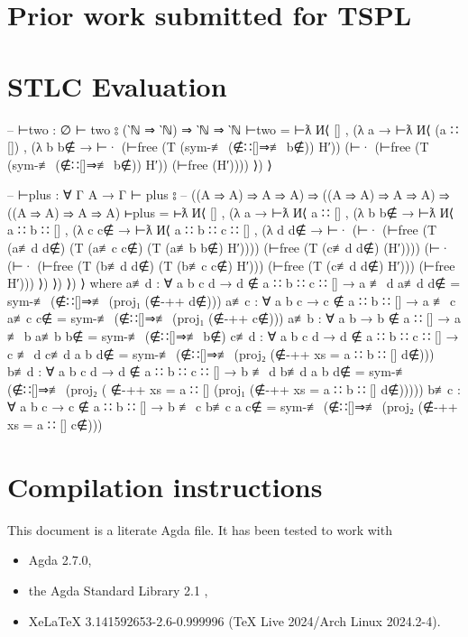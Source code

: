 \documentclass[logo,bsc,singlespacing,parskip,online]{infthesis}
\renewenvironment{code}{\mintedcopy[breaklines,breaksymbolleft=\;]{agda}}{\endmintedcopy}
\begin{document}
\chapter{Prior work submitted for TSPL}
\label{appendix:tspl}


\chapter{STLC Evaluation}
\label{appendix:evaluation_proofs}
\begin{code}
-- ⊢two : ∅ ⊢ two ⦂ (‵ℕ ⇒ ‵ℕ) ⇒ ‵ℕ ⇒ ‵ℕ
⊢two = ⊢ƛ
  И⟨ []
  , (λ a → ⊢ƛ
    И⟨ (a ∷ [])
    , (λ b {b∉} →
      ⊢·
      (⊢free (T (sym-≢ (∉∷[]⇒≢ b∉)) H′))
      (⊢· (⊢free (T (sym-≢ (∉∷[]⇒≢ b∉)) H′)) (⊢free (H′)))) ⟩) ⟩

-- ⊢plus : ∀ {Γ A} → Γ ⊢ plus ⦂
-- ((A ⇒ A) ⇒ A ⇒ A) ⇒ ((A ⇒ A) ⇒ A ⇒ A) ⇒ ((A ⇒ A) ⇒ A ⇒ A)
⊢plus = ⊢ƛ
  И⟨ []
  , (λ a → ⊢ƛ
    И⟨ a ∷ []
    , (λ b {b∉} → ⊢ƛ
      И⟨ a ∷ b ∷ []
      , (λ c {c∉} → ⊢ƛ
        И⟨ a ∷ b ∷ c ∷ []
        , (λ d {d∉} →
        ⊢·
          (⊢·
            (⊢free (T (a≢d d∉) (T (a≢c c∉) (T (a≢b b∉) H′))))
            (⊢free (T (c≢d d∉) (H′))))
          (⊢·
            (⊢·
              (⊢free (T (b≢d d∉) (T (b≢c c∉) H′)))
              (⊢free (T (c≢d d∉) H′)))
            (⊢free H′))) ⟩) ⟩) ⟩) ⟩
  where
    a≢d : ∀ {a b c d} → d ∉ a ∷ b ∷ c ∷ [] → a ≢ d
    a≢d d∉ = sym-≢ (∉∷[]⇒≢ (proj₁ (∉-++ d∉)))
    a≢c : ∀ {a b c} → c ∉ a ∷ b ∷ [] → a ≢ c
    a≢c c∉ = sym-≢ (∉∷[]⇒≢ (proj₁ (∉-++ c∉)))
    a≢b : ∀ {a b} → b ∉ a ∷ [] → a ≢ b
    a≢b b∉ = sym-≢ (∉∷[]⇒≢ b∉)
    c≢d : ∀ {a b c d} → d ∉ a ∷ b ∷ c ∷ [] → c ≢ d
    c≢d {a} {b} d∉ =
      sym-≢ (∉∷[]⇒≢ (proj₂ (∉-++ {xs = a ∷ b ∷ []} d∉)))
    b≢d : ∀ {a b c d} → d ∉ a ∷ b ∷ c ∷ [] → b ≢ d
    b≢d {a} {b} d∉ =
      sym-≢ (∉∷[]⇒≢ (proj₂ (
        ∉-++
          {xs = a ∷ []}
          (proj₁ (∉-++ {xs = a ∷ b ∷ []} d∉)))))
    b≢c : ∀ {a b c} → c ∉ a ∷ b ∷ [] → b ≢ c
    b≢c {a} c∉ = sym-≢ (∉∷[]⇒≢ (proj₂ (∉-++ {xs = a ∷ []} c∉)))
\end{code}

\chapter{Compilation instructions}
\label{appendix:compilation_instructions}

This document is a literate Agda file. It has been tested to work with
\begin{itemize}
  \item Agda 2.7.0,
  \item the Agda Standard Library 2.1 \citep{the_agda_community_agda_2024},
  \item XeLaTeX 3.141592653-2.6-0.999996 (TeX Live 2024/Arch Linux 2024.2-4).
\end{itemize}
\end{document}
